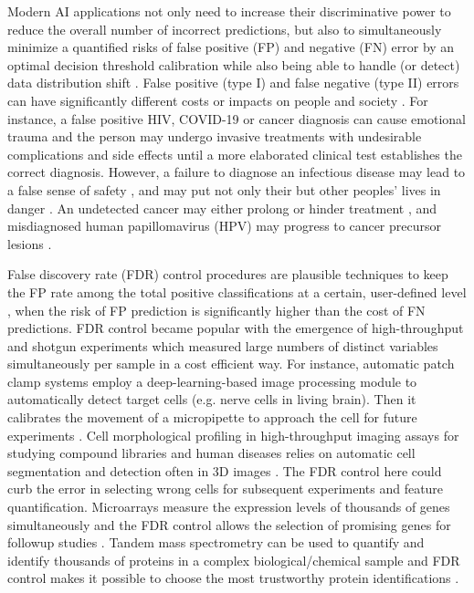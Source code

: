 \documentclass{article}
\begin{document}
Modern AI applications not only need to increase their discriminative power to reduce the overall number of incorrect predictions, but also to simultaneously minimize a quantified risks of false positive (FP) and negative (FN) error by an optimal decision threshold calibration while also being able to handle (or detect) data distribution shift \cite{feng2022clinical, al2023artificial}. False positive (type I) and false negative (type II) errors can have significantly different costs or impacts on people and society \cite{wynants2019three}. For instance, a false positive HIV, COVID-19 or cancer diagnosis can cause emotional trauma and the person may undergo invasive treatments with undesirable complications and side effects \cite{newman2021rate, salz2010meta, Tosteson2014Consequences, xu2016frequency} until a more elaborated clinical test establishes the correct diagnosis. However, a failure to diagnose an infectious disease may lead to a false sense of safety \cite{mouliou2021false}, and may put not only their but other peoples' lives in danger \cite{woloshin2020false}. An undetected cancer may either prolong or hinder treatment \cite{bradley2021interpreting}, and misdiagnosed human papillomavirus (HPV) may progress to cancer precursor lesions \cite{macios2022false,pinsky2015principles}. 


False discovery rate (FDR) control procedures are plausible techniques to keep the FP rate among the total positive classifications at a certain, user-defined level \cite{Benjamini1995Controlling}, when the risk of FP prediction is significantly higher than the cost of FN predictions. FDR control became popular with the emergence of high-throughput and shotgun experiments which measured large numbers of distinct variables simultaneously per sample in a cost efficient way. For instance, automatic patch clamp systems employ a deep-learning-based image processing module to automatically detect target cells (e.g. nerve cells in living brain). Then it calibrates the movement of a micropipette to approach the cell for future experiments \cite{koos2021automatic}. Cell morphological profiling in high-throughput imaging assays for studying compound libraries and human diseases \cite{moshkov2024learning} relies on automatic cell segmentation and detection often in 3D images \cite{falk2019u}. The FDR control here could curb the error in selecting wrong cells for subsequent experiments and feature quantification.  Microarrays measure the expression levels of thousands of genes simultaneously and the FDR control allows the selection of promising genes for followup studies \cite{storey2002direct,storey2003statistical,barber2015controlling}. Tandem mass spectrometry can be used to quantify and identify thousands of proteins in a complex biological/chemical sample and FDR control makes it possible to choose the most trustworthy protein identifications \cite{elias2007target}.
\end{document}
